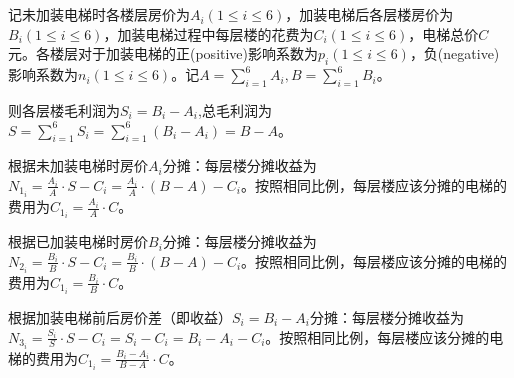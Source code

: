 \documentclass[lang=cn,a4paper]{elegantpaper}
\begin{document}

    \section{}
    \subsection{}
    记未加装电梯时各楼层房价为$A_i(1\leqslant i\leqslant 6)$，加装电梯后各层楼房价为$B_i(1\leqslant i\leqslant 6)$，加装电梯过程中每层楼的花费为$C_i(1\leqslant i\leqslant 6)$，电梯总价$C$元。各楼层对于加装电梯的正(positive)影响系数为$p_i(1\leqslant i\leqslant 6)$，负(negative)影响系数为$n_i(1\leqslant i\leqslant 6)$。记$\displaystyle A=\sum_{i=1}^6A_i,B=\sum_{i=1}^6B_i$。

    则各层楼毛利润为$S_i=B_i-A_i$,总毛利润为$\displaystyle S=\sum_{i=1}^{6}S_i=\sum_{i=1}^{6}(B_i-A_i)=B-A$。

    根据未加装电梯时房价$A_i$分摊：每层楼分摊收益为$\displaystyle N_{1_i}=\frac{A_i}{A}\cdot S-C_i=\frac{A_i}{A}\cdot(B-A)-C_i$。按照相同比例，每层楼应该分摊的电梯的费用为$\displaystyle C_{1_i}=\frac{A_i}{A}\cdot C$。

    根据已加装电梯时房价$B_i$分摊：每层楼分摊收益为$\displaystyle N_{2_i}=\frac{B_i}{B}\cdot S-C_i=\frac{B_i}{B}\cdot(B-A)-C_i$。按照相同比例，每层楼应该分摊的电梯的费用为$\displaystyle C_{1_i}=\frac{B_i}{B}\cdot C$。

    根据加装电梯前后房价差（即收益）$S_i=B_i-A_i$分摊：每层楼分摊收益为$\displaystyle N_{3_i}=\frac{S_i}{S}\cdot S-C_i=S_i-C_i=B_i-A_i-C_i$。按照相同比例，每层楼应该分摊的电梯的费用为$\displaystyle C_{1_i}=\frac{B_i-A_i}{B-A}\cdot C$。
\end{document}
